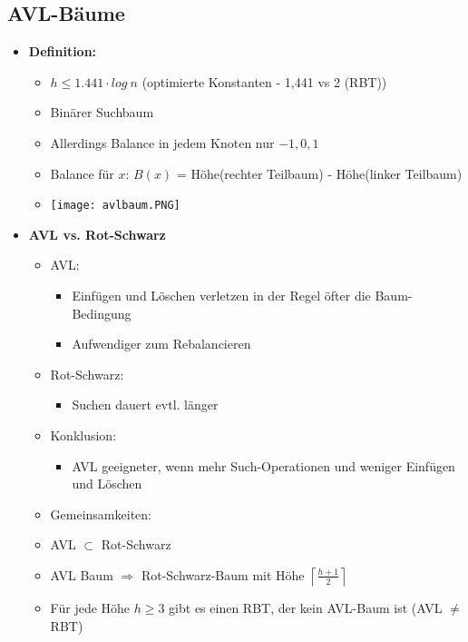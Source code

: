 \subsection{AVL-Bäume}
    \begin{itemize}
        \item \textbf{Definition:}
            \begin{itemize}
                \item $h \leq 1.441 \cdot log~n$ (optimierte Konstanten - 1,441 vs 2 (RBT))
                \item Binärer Suchbaum
                \item Allerdings Balance in jedem Knoten nur $-1,0,1$
                \item Balance für $x$: $B(x)$ = Höhe(rechter Teilbaum) - Höhe(linker Teilbaum)
                \item[] \texttt{[image: avlbaum.PNG]}
            \end{itemize}
        
        \item \textbf{AVL vs. Rot-Schwarz}
            \begin{itemize}
                \item AVL:
                    \begin{itemize}
                        \item Einfügen und Löschen verletzen in der Regel öfter die Baum-Bedingung
                        \item Aufwendiger zum Rebalancieren
                    \end{itemize}
                \item Rot-Schwarz:
                    \begin{itemize}
                        \item Suchen dauert evtl. länger
                    \end{itemize}
                \item Konklusion:
                    \begin{itemize}
                        \item AVL geeigneter, wenn mehr Such-Operationen und weniger Einfügen und Löschen
                    \end{itemize}
                \item Gemeinsamkeiten:
                    \item AVL $\subset$ Rot-Schwarz
                    \item AVL Baum $\Rightarrow$ Rot-Schwarz-Baum mit Höhe $\left \lceil \frac{h+1}{2} \right \rceil$
                    \item Für jede Höhe $h \geq 3$ gibt es einen RBT, der kein AVL-Baum ist (AVL $\neq$ RBT)
            \end{itemize}


\end{itemize}
